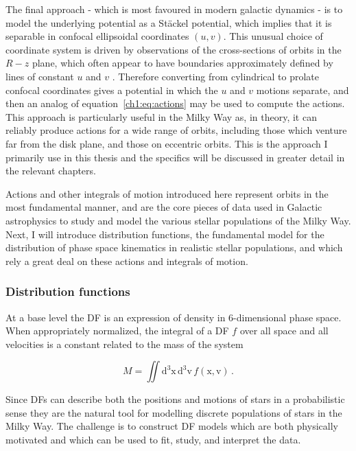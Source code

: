 The final approach - which is most favoured in modern galactic dynamics - is to model the underlying potential as a St\"{a}ckel potential, which implies that it is separable in confocal ellipsoidal coordinates $(u,v)$. This unusual choice of coordinate system is driven by observations of the cross-sections of orbits in the $R-z$ plane, which often appear to have boundaries approximately defined by lines of constant $u$ and $v$ \parencite[see figure 3.27 in ][]{binney08}. Therefore converting from cylindrical to prolate confocal coordinates gives a potential in which the $u$ and $v$ motions separate, and then an analog of equation~\eqref{ch1:eq:actions} may be used to compute the actions. This approach is particularly useful in the Milky Way as, in theory, it can reliably produce actions for a wide range of orbits, including those which venture far from the disk plane, and those on eccentric orbits. This is the approach I primarily use in this thesis and the specifics will be discussed in greater detail in the relevant chapters.

Actions and other integrals of motion introduced here represent orbits in the most fundamental manner, and are the core pieces of data used in Galactic astrophysics to study and model the various stellar populations of the Milky Way. Next, I will introduce distribution functions, the fundamental model for the distribution of phase space kinematics in realistic stellar populations, and which rely a great deal on these actions and integrals of motion.

\subsubsection{Distribution functions}

At a base level the DF is an expression of density in 6-dimensional phase space. When appropriately normalized, the integral of a DF $f$ over all space and all velocities is a constant related to the mass of the system

\begin{equation}
    \label{ch1:eq:df-normalization}
    M = \iint \mathrm{d}^3\mathbf{\mathrm{x}}\, \mathrm{d}^3\mathbf{\mathrm{v}}\, f( \mathbf{\mathrm{x}}, \mathbf{\mathrm{v}}) \,.
\end{equation}

\noindent Since DFs can describe both the positions and motions of stars in a probabilistic sense they are the natural tool for modelling discrete populations of stars in the Milky Way. The challenge is to construct DF models which are both physically motivated and which can be used to fit, study, and interpret the data.

